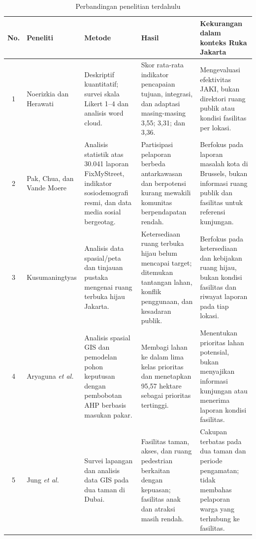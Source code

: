 \documentclass[conference]{IEEEtran}
\begin{document}
\begin{table}[!t]
    \centering
    \caption{Perbandingan penelitian terdahulu}
    \label{tab:penelitian-terkait}
    \scriptsize
    \renewcommand{\arraystretch}{1.2}
    \begin{tabular}{|c|p{2.5cm}|p{3.7cm}|p{4.0cm}|p{4.4cm}|}
        \hline
        \textbf{No.} & \textbf{Peneliti} & \textbf{Metode} & \textbf{Hasil} & \textbf{Kekurangan dalam konteks Ruka Jakarta} \\
        \hline
        1 & Noerizkia dan Herawati \cite{jaki} & Deskriptif kuantitatif; survei skala Likert 1--4 dan analisis word cloud. & Skor rata-rata indikator pencapaian tujuan, integrasi, dan adaptasi masing-masing 3,55; 3,31; dan 3,36. & Mengevaluasi efektivitas JAKI, bukan direktori ruang publik atau kondisi fasilitas per lokasi. \\
        \hline
        2 & Pak, Chua, dan Vande Moere \cite{pak2017} & Analisis statistik atas 30.041 laporan FixMyStreet, indikator sosiodemografi resmi, dan data media sosial bergeotag. & Partisipasi pelaporan berbeda antarkawasan dan berpotensi kurang mewakili komunitas berpendapatan rendah. & Berfokus pada laporan masalah kota di Brussels, bukan informasi ruang publik dan fasilitas untuk referensi kunjungan. \\
        \hline
        3 & Kusumaningtyas \cite{kusumaningtyas2024} & Analisis data spasial/peta dan tinjauan pustaka mengenai ruang terbuka hijau Jakarta. & Ketersediaan ruang terbuka hijau belum mencapai target; ditemukan tantangan lahan, konflik penggunaan, dan kesadaran publik. & Berfokus pada ketersediaan dan kebijakan ruang hijau, bukan kondisi fasilitas dan riwayat laporan pada tiap lokasi. \\
        \hline
        4 & Aryaguna \textit{et al.} \cite{aryaguna2022} & Analisis spasial GIS dan pemodelan pohon keputusan dengan pembobotan AHP berbasis masukan pakar. & Membagi lahan ke dalam lima kelas prioritas dan menetapkan 95,57 hektare sebagai prioritas tertinggi. & Menentukan prioritas lahan potensial, bukan menyajikan informasi kunjungan atau menerima laporan kondisi fasilitas. \\
        \hline
        5 & Jung \textit{et al.} \cite{jung2022} & Survei lapangan dan analisis data GIS pada dua taman di Dubai. & Fasilitas taman, akses, dan ruang pedestrian berkaitan dengan kepuasan; fasilitas anak dan atraksi masih rendah. & Cakupan terbatas pada dua taman dan periode pengamatan; tidak membahas pelaporan warga yang terhubung ke fasilitas. \\
        \hline
    \end{tabular}
\end{table}
\end{document}
